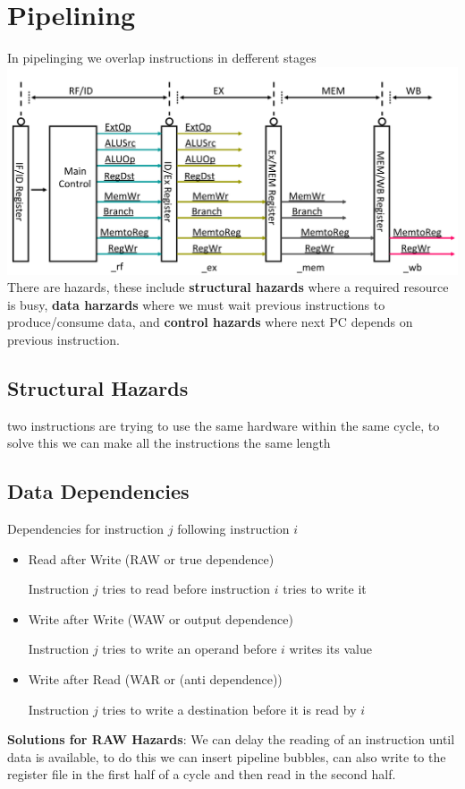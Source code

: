 \section{Pipelining}
In pipelinging we overlap instructions in defferent stages
\includegraphics[width=\linewidth]{png/pipe.png}
There are hazards, these include \textbf{structural hazards}
where a required resource is busy, \textbf{data harzards} where we must wait previous
instructions to produce/consume data, and \textbf{control hazards} where next PC
depends on previous instruction.

\subsection*{Structural Hazards}
two instructions are trying to use the same hardware within the same cycle, to
solve this we can make all the instructions the same length

\subsection*{Data Dependencies}
Dependencies for instruction $j$ following instruction $i$
\begin{itemize}
\item Read after Write (RAW or true dependence)
	\par Instruction $j$ tries to read before instruction $i$ tries to write it
\item Write after Write (WAW or output dependence)
	\par Instruction $j$ tries to write an operand before $i$ writes its value
\item Write after Read (WAR or (anti dependence))
	\par Instruction $j$ tries to write a destination before it is read by $i$
\end{itemize}
\textbf{Solutions for RAW Hazards}: We can delay the reading of an instruction
until data is available, to do this we can insert pipeline bubbles, can also write
to the register file in the first half of a cycle and then read in the second half.

